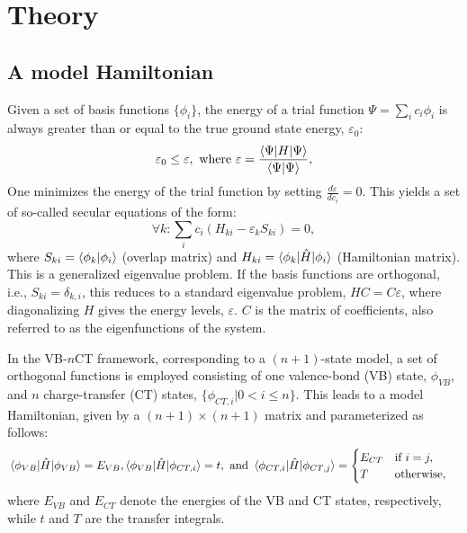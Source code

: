 \documentclass[12pt,a4paper]{article}
\begin{document}
\section{Theory}

\subsection{A model Hamiltonian}\label{sec:hamiltonian}

Given a set of basis functions $\{\phi_i\}$, the energy of a trial function $\Psi = \sum_i c_i \phi_i$ is always greater than or equal to the true ground state energy, $\varepsilon_0$:\begin{equation*}
	 \varepsilon_0 \leq \varepsilon, \text{ where } \varepsilon = \frac{\braket{\Psi|H|\Psi}}{\braket{\Psi|\Psi}},
\end{equation*}
One minimizes the energy of the trial function by setting $\frac{d\varepsilon}{dc_i} = 0$. 
This yields a set of so-called secular equations of the form:\begin{equation}
	\forall k: \sum_i c_i (H_{ki} - \varepsilon_k S_{ki}) = 0, 
\end{equation}
where $S_{ki} = \braket{\phi_k | \phi_i}$ (overlap matrix) and $H_{ki} = \braket{\phi_k | \hat{H} | \phi_i}$ (Hamiltonian matrix). 
This is a generalized eigenvalue problem. 
If the basis functions are orthogonal, i.e., $S_{ki} = \delta_{k,i}$, this reduces to a standard eigenvalue problem, $HC=C\varepsilon$, where diagonalizing $H$ gives the energy levels, $\varepsilon$. $C$ is the matrix of coefficients, also referred to as the eigenfunctions of the system.

In the VB-$n$CT framework, corresponding to a $(n+1)$-state model, a set of orthogonal functions is employed consisting of one valence-bond (VB) state, $\phi_{VB}$, and $n$ charge-transfer (CT) states, $\{\phi_{CT,i}|0<i\leq n\}$. This leads to a model Hamiltonian, given by a $(n+1)\times(n+1)$ matrix and parameterized as follows:
\begin{align}
	&\braket{\phi_{VB}|\hat{H}|\phi_{VB}} = E_{VB}, 
	\braket{\phi_{VB}|\hat{H}|\phi_{CT,i}} = t, \text{ and } 
	\braket{\phi_{CT,i}|\hat{H}|\phi_{CT,j}} = \begin{cases}
		E_{CT} & \text{if } i=j,\\
		T & \text{otherwise},
	\end{cases}\label{eq:hamilonian}
\end{align}
where $E_{VB}$ and $E_{CT}$ denote the energies of the VB and CT states, respectively, while $t$ and $T$ are the transfer integrals. 
\end{document}

